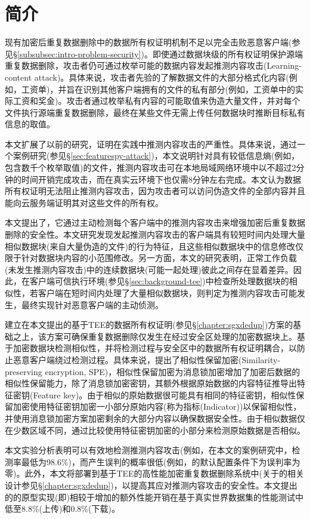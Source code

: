 \section{简介}
\label{sec:featurespy-intro}

现有加密后重复数据删除中的数据所有权证明机制不足以完全击败恶意客户端(参见\S\ref{subsubsec:intro-problem-security})。即使通过数据块级的所有权证明保护源端重复数据删除，攻击者仍可通过枚举可能的数据内容发起推测内容攻击(Learning-content attack)\cite{harnik2010side, zuo2018mitigating}。具体来说，攻击者先验的了解数据文件的大部分格式化内容(例如，工资单)，并旨在识别其他客户端拥有的文件的私有部分(例如，工资单中的实际工资和奖金)。攻击者通过枚举私有内容的可能取值来伪造大量文件，并对每个文件执行源端重复数据删除，最终在某些文件无需上传任何数据块时推断目标私有信息的取值。

本文扩展了以前的研究\cite{harnik2010side, zuo2018mitigating}，证明在实践中推测内容攻击的严重性。具体来说，通过一个案例研究(参见\S\ref{sec:featurespy-attack})，本文说明针对具有较低信息熵(例如，包含数千个枚举取值)的文件，推测内容攻击可在本地局域网络环境中以不超过2分钟的时间开销完成攻击，而在真实云环境下也仅需8分钟左右完成。本文认为数据所有权证明无法阻止推测内容攻击，因为攻击者可以访问伪造文件的全部内容并且能向云服务端证明其对这些文件的所有权。

本文提出了\sysnameF，它通过主动检测每个客户端中的推测内容攻击来增强加密后重复数据删除的安全性。本文研究发现发起推测内容攻击的客户端具有较短时间内处理大量相似数据块(来自大量伪造的文件)的行为特征，且这些相似数据块中的信息修改仅限于针对数据块内容的小范围修改。另一方面，本文的研究表明，正常工作负载(未发生推测内容攻击)中的连续数据块(可能一起处理)彼此之间存在显着差异。因此，\sysnameF 在客户端可信执行环境(参见\S\ref{sec:background-tee})中检查所处理数据块的相似性，若客户端在短时间内处理了大量相似数据块，则判定为推测内容攻击可能发生，最终实现针对恶意客户端的主动侦测。

\sysnameF 建立在本文提出的基于TEE的数据所有权证明(参见\S\ref{chapter:sgxdedup})方案的基础之上，该方案可确保重复数据删除仅发生在经过安全区处理的加密数据块上。\sysnameF 基于加密数据块检测相似性，并将检测过程与安全区中的数据所有权证明耦合，以防止恶意客户端绕过检测过程。具体来说，\sysnameF 提出了相似性保留加密(Similarity-preserving
encryption, SPE)，相似性保留加密为消息锁加密增加了加密后数据的相似性保留能力，除了消息锁加密密钥，其额外根据原始数据的内容特征推导出特征密钥(Feature key)。由于相似的原始数据很可能具有相同的特征密钥，相似性保留加密使用特征密钥加密一小部分原始内容(称为指标(Indicator))以保留相似性，并使用消息锁加密方案加密剩余的大部分内容以确保数据安全性。由于相似数据仅在少数区域不同，\sysnameF 通过比较使用特征密钥加密的小部分来检测原始数据是否相似。

本文实验分析表明\sysnameF 可以有效地检测推测内容攻击(例如，在本文的案例研究中，检测率最低为98.6\%)，而产生误判的概率很低(例如，\sysnameF 的默认配置条件下为误判率为零)。此外，本文将\sysnameF 部署到基于TEE的高性能加密重复数据删除系统\sysnameS 中(关于\sysnameS 的相关设计参见\S\ref{chapter:sgxdedup})，以提高其应对推测内容攻击的安全性。本文提出的\sysnameF 的原型实现(即\prototype)相较于\sysnameS 增加的额外性能开销在基于真实世界数据集的性能测试中低至8.8\%(上传)和0.8\%(下载)。